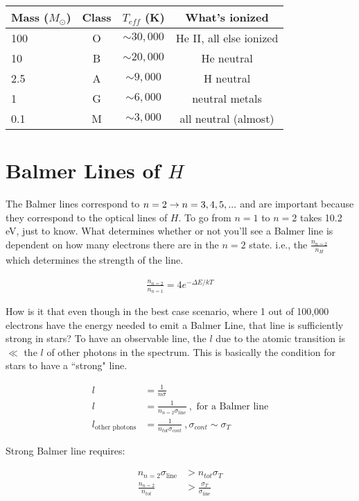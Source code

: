 \begin{center}
\begin{tabular}{lccc}
\hline
Mass ($M_\odot$)&Class&$T_{eff}$ (K)&What's ionized\\ \hline
100&O& $ \sim 30,000$&He II, all else ionized\\ \hline
10&B& $\sim 20,000$&He neutral\\ \hline
2.5&A&$ \sim 9,000$&H neutral\\ \hline
1&G& $\sim 6,000$&neutral metals\\ \hline
0.1&M&$\sim 3,000$&all neutral (almost)\\ \hline
\end{tabular}
\end{center}

\section{Balmer Lines of $H$}

The Balmer lines correspond to $n=2 \rightarrow n=3,4,5,...$ and are important because they correspond to the optical lines of $H$. To go from $n=1$ to $n=2$ takes 10.2 eV, just to know. What determines whether or not you'll see a Balmer line is dependent on how many electrons there are in the $n=2$ state. i.e., the $\frac{n_{n=2}}{n_H}$ which determines the strength of the line. 

\begin{align}
\frac{n_{n=2}}{n_{n=1}} = 4e^{-\Delta E /kT}
\end{align}

How is it that even though in the best case scenario, where 1 out of 100,000 electrons have the energy needed to emit a Balmer Line, that line is sufficiently strong in stars? To have an observable line, the $l$ due to the atomic transition is $\ll$ the $l$ of other photons in the spectrum. This is basically the condition for stars to have a ``strong" line. 

\begin{align}
l &= \frac{1}{n \sigma}\\
l &= \frac{1}{n_{n=2} \sigma_{\text{line}}}~,\text{ for a Balmer line}\\
l_{\text{other photons}} &= \frac{1}{n_{tot} \sigma_{cont}}~,\sigma_{cont} \sim \sigma_T
\end{align}

Strong Balmer line requires:

\begin{align}
n_{n=2}\sigma_{\text{line}} &> n_{tot}\sigma_T\\
\frac{n_{n=2}}{n_{tot}} &> \frac{\sigma_T}{\sigma_{\text{line}}}
\end{align}

